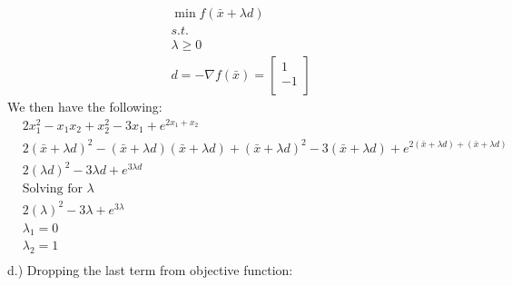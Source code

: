\documentclass[12pt]{article}
\begin{document}
    \begin{align*}
        &\min f(\bar x + \lambda d)\\
        &s.t. \\
        &\lambda \geq 0\\
        &d = -\nabla f(\bar x) = 
        \begin{bmatrix}
            1\\
            -1\\
        \end{bmatrix}
    \end{align*}
We then have the following: 
    \begin{align*}
        &2x_1^2 -x_1x_2 + x_2^2 - 3x_1 + e^{2x_1 + x_2}\\
        &2(\bar x + \lambda d)^2 -(\bar x + \lambda d)(\bar x + \lambda d) + (\bar x + \lambda d)^2 - 3(\bar x + \lambda d)+ e^{2(\bar x + \lambda d) + (\bar x + \lambda d)}\\
        &2(\lambda d)^2 - 3\lambda  d + e^{3 \lambda d}\\
        &\text{Solving for } \lambda \\ 
        &2(\lambda)^2 - 3\lambda+ e^{3 \lambda}\\
        &\lambda_1 = 0\\
        &\lambda_2 = 1\\
    \end{align*}
d.) Dropping the last term from objective function:\\
\end{document}

